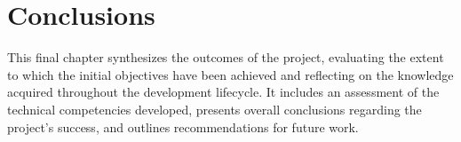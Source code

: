 \section{Conclusions}

This final chapter synthesizes the outcomes of the project, evaluating the extent to which the initial objectives have been achieved and reflecting on the knowledge acquired throughout the development lifecycle. It includes an assessment of the technical competencies developed, presents overall conclusions regarding the project's success, and outlines recommendations for future work.





